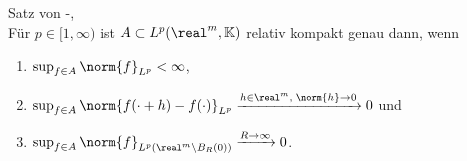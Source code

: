 \begin{Satz}{Satz von -, }\\
    Für $p \in [1, \infty)$ ist $A \subset L^p(\real^m, \KK)$ relativ kompakt genau dann, wenn
    \begin{enumerate}
        \item
        $\sup_{f \in A} \norm{f}_{L^p} < \infty$,
        
        \item
        $\sup_{f \in A} \norm{f(\cdot + h) - f(\cdot)}_{L^p}
        \xrightarrow{h \in \real^m,\; \norm{h} \to 0} 0$ und
        
        \item
        $\sup_{f \in A} \norm{f}_{L^p(\real^m \setminus B_R(0))}
        \xrightarrow{R \to \infty} 0$.
    \end{enumerate}
\end{Satz}

\pagebreak
